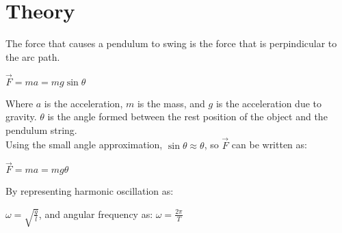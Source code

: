 \documentclass{article}
\begin{document}


\section{Theory}

The force that causes a pendulum to swing is the force that is perpindicular to the arc path.\\

\begin{center}
  {$ \vec{F} = ma = mg \sin \theta$}\\
\end{center}

Where $a$ is the acceleration, $m$ is the mass, and $g$ is the acceleration due to gravity.
$\theta$ is the angle formed between the rest position of the object and the pendulum string.\\

Using the small angle approximation, {$\sin \theta \approx \theta$}, so $\vec{F}$ can be written as:\\

\begin{center}
  {$ \vec{F} = ma = mg\theta$}\\
\end{center}

By representing harmonic oscillation as:\\

\begin{center}
  {$\omega = \sqrt{\frac{g}{l}}$}, and angular frequency as: {$ \omega = \frac{2\pi}{T}$}
\end{center}
\end{document}
